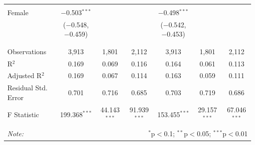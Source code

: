 \documentclass[12pt,a4paper]{article}
\numberwithin{equation}{section}
\begin{document}
\begin{landscape}
\begin{table}[!htbp]
\begin{tabular}{@{\extracolsep{5pt}}lcccccc}
			& & & & & & \\ 
			Female & $-$0.503$^{***}$ &  &  & $-$0.498$^{***}$ &  &  \\ 
			& ($-$0.548, $-$0.459) &  &  & ($-$0.542, $-$0.453) &  &  \\ 
			& & & & & & \\ 
			\hline \\[-1.8ex] 
			Observations & 3,913 & 1,801 & 2,112 & 3,913 & 1,801 & 2,112 \\ 
			R$^{2}$ & 0.169 & 0.069 & 0.116 & 0.164 & 0.061 & 0.113 \\ 
			Adjusted R$^{2}$ & 0.169 & 0.067 & 0.114 & 0.163 & 0.059 & 0.111 \\ 
			Residual Std. Error & 0.701 & 0.716 & 0.685 & 0.703 & 0.719 & 0.686 \\ 
			F Statistic & 199.368$^{***}$ & 44.143$^{***}$ & 91.939$^{***}$ & 153.455$^{***}$ & 29.157$^{***}$ & 67.046$^{***}$ \\ 
			\hline 
			\hline \\[-1.8ex] 
			\textit{Note:}  & \multicolumn{6}{r}{$^{*}$p$<$0.1; $^{**}$p$<$0.05; $^{***}$p$<$0.01} \\ 
		\end{tabular} 
	\end{table} 
	
\end{landscape}

\newpage
\end{document}
